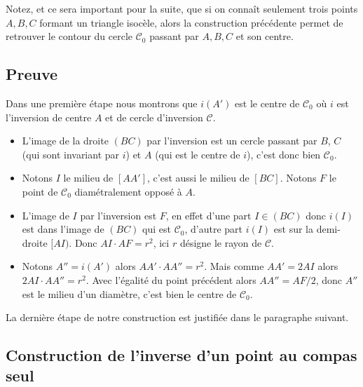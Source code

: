 \documentclass[11pt,class=report,crop=false]{standalone}
\newcommand{\inversion}{i}
\begin{document}
\begin{remarque*}
Notez, et ce sera important pour la suite, que si on connaît seulement trois points $A,B,C$
formant un triangle isocèle, alors la construction précédente permet de retrouver le contour du cercle $\mathcal{C}_0$ 
passant par $A,B,C$ et son centre.
\end{remarque*}

\subsection{Preuve}

Dans une première étape nous montrons que $\inversion(A')$ est le centre
de $\mathcal{C}_0$ où $\inversion$ est l'inversion de centre $A$ et de cercle d'inversion
$\mathcal{C}$.

\begin{itemize}
 \item L'image de la droite $(BC)$ par l'inversion est un cercle passant par $B$, $C$ (qui sont invariant par $\inversion$) et $A$ (qui est le centre de $\inversion$), c'est donc bien $\mathcal{C}_0$.
 
 \item Notons $I$ le milieu de $[AA']$, c'est aussi le milieu de $[BC]$.
 Notons $F$ le point de $\mathcal{C}_0$ diamétralement opposé à $A$.
 
 \item L'image de $I$ par l'inversion est $F$, en effet d'une part $I \in (BC)$ donc
 $\inversion(I)$ est dans l'image de $(BC)$ qui est $\mathcal{C}_0$, d'autre part $\inversion(I)$ est sur la demi-droite $[AI)$. 
 Donc $AI \cdot AF = r^2$,
 ici $r$ désigne le rayon de $\mathcal{C}$.
 
 \item Notons $A''=\inversion(A')$ alors $AA' \cdot AA''= r^2$. Mais comme $AA' = 2 AI$
 alors $2 AI\cdot AA''= r^2$. Avec l'égalité du point précédent alors $AA'' = AF/2$, donc $A''$ est le milieu d'un diamètre, c'est bien le centre de $\mathcal{C}_0$.
\end{itemize}

La dernière étape de notre construction est justifiée dans le paragraphe suivant.

\subsection{Construction de l'inverse d'un point au compas seul}
\end{document}
